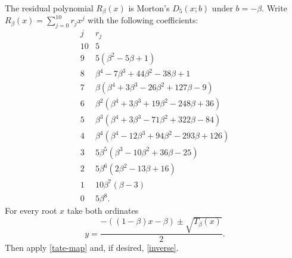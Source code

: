\documentclass[11pt]{article}
\begin{document}
The residual polynomial $R_\beta(x)$ is Morton's $D_5(x;b)$
\cite[section 2, p.~5 of the arXiv version]{morton} under $b=-\beta$.
Write $R_\beta(x)=\sum_{j=0}^{10}r_jx^j$ with the following coefficients:
\begin{equation}\label{residual-table}
\begin{array}{c|l}
j&r_j\\\hline
10&5\\
9&5(\beta^2-5\beta+1)\\
8&\beta^4-7\beta^3+44\beta^2-38\beta+1\\
7&\beta(\beta^4+3\beta^3-26\beta^2+127\beta-9)\\
6&\beta^2(\beta^4+3\beta^3+19\beta^2-248\beta+36)\\
5&\beta^3(\beta^4+3\beta^3-71\beta^2+322\beta-84)\\
4&\beta^4(\beta^4-12\beta^3+94\beta^2-293\beta+126)\\
3&5\beta^5(\beta^3-10\beta^2+36\beta-25)\\
2&5\beta^6(2\beta^2-13\beta+16)\\
1&10\beta^7(\beta-3)\\
0&5\beta^8.
\end{array}
\end{equation}
For every root $x$ take both ordinates
\begin{equation}\label{ordinates}
y=\frac{-((1-\beta)x-\beta)\pm\sqrt{T_\beta(x)}}2.
\end{equation}
Then apply \eqref{tate-map} and, if desired, \eqref{inverse}.
\end{document}
